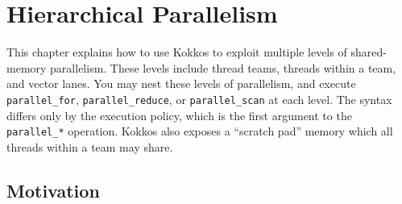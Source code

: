 \section{Hierarchical Parallelism}\label{C:Hierarchical}

This chapter explains how to use Kokkos to exploit multiple levels of shared-memory parallelism.
These levels include thread teams, threads within a team, and vector lanes.
You may nest these levels of parallelism,
and execute \lstinline!parallel_for!, \lstinline!parallel_reduce!, or \lstinline!parallel_scan! at each level.
The syntax differs only by the execution policy,
which is the first argument to the \verb!parallel_*! operation.
Kokkos also exposes a ``scratch pad'' memory which all threads within a team may share.

\subsection{Motivation}\label{S:Hierarchical:Motivation}

